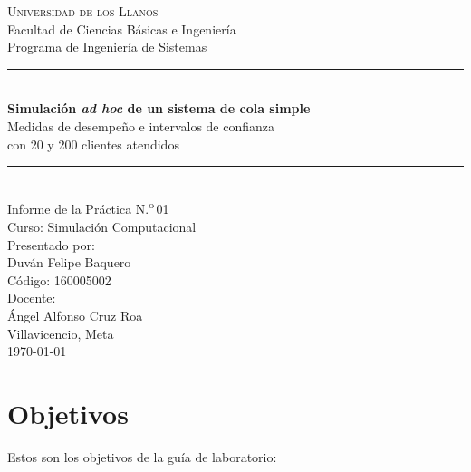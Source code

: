 \documentclass[11pt,letterpaper]{article}
\newcommand{\nombreEstudiante}{Duván Felipe Baquero}
\newcommand{\codigoEstudiante}{160005002}
\newcommand{\nombreDocente}{Ángel Alfonso Cruz Roa}
\begin{document}
\begin{titlepage}
\thispagestyle{empty}
\centering
\vspace*{\fill}

{\large \textsc{Universidad de los Llanos}}\\[0.2cm]
{\normalsize Facultad de Ciencias Básicas e Ingeniería}\\
{\normalsize Programa de Ingeniería de Sistemas}\\[1.6cm]

\rule{\textwidth}{0.8pt}\\[0.5cm]
{\LARGE \textbf{Simulación \emph{ad hoc} de un sistema de cola simple}}\\[0.35cm]
{\large Medidas de desempeño e intervalos de confianza\\ con 20 y 200 clientes atendidos}\\[0.5cm]
\rule{\textwidth}{0.8pt}\\[1.6cm]

{\normalsize Informe de la Práctica N.\textsuperscript{o}\,01}\\
{\normalsize Curso: Simulación Computacional}\\[1.4cm]

{\normalsize Presentado por:}\\[0.15cm]
{\large \nombreEstudiante}\\
{\normalsize Código: \codigoEstudiante}\\[1.2cm]

{\normalsize Docente:}\\[0.15cm]
{\large \nombreDocente}\\[1.6cm]

{\normalsize Villavicencio, Meta \\ \today}

\vspace*{\fill}
\end{titlepage}

\newpage
\tableofcontents
\newpage

\section{Objetivos}

Estos son los objetivos de la guía de laboratorio:
\end{document}
